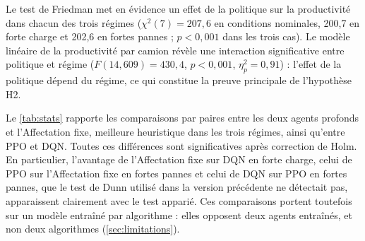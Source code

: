 \documentclass[11pt,a4paper]{article}
\newif\ifrevmarks
\newcommand{\revtag}[1]{\ifrevmarks\textsuperscript{\textcolor{red!70!black}{\scriptsize[#1]}}\fi}
\newenvironment{revbloc}[1]{\par\ifrevmarks\color{revcolor}\noindent\revtag{#1}\ \fi}{\par}
\begin{document}
\begin{revbloc}{M3, M4, M5, M6}
Le test de Friedman met en évidence un effet de la politique sur la productivité dans chacun des trois régimes ($\chi^2(7) = 207{,}6$ en conditions nominales, 200,7 en forte charge et 202,6 en fortes pannes ; $p<0{,}001$ dans les trois cas). Le modèle linéaire de la productivité par camion révèle une interaction significative entre politique et régime ($F(14, 609) = 430{,}4$, $p<0{,}001$, $\eta^2_p = 0{,}91$) : l'effet de la politique dépend du régime, ce qui constitue la preuve principale de l'hypothèse H2.

Le \cref{tab:stats} rapporte les comparaisons par paires entre les deux agents profonds et l'Affectation fixe, meilleure heuristique dans les trois régimes, ainsi qu'entre PPO et DQN. Toutes ces différences sont significatives après correction de Holm. En particulier, l'avantage de l'Affectation fixe sur DQN en forte charge, celui de PPO sur l'Affectation fixe en fortes pannes et celui de DQN sur PPO en fortes pannes, que le test de Dunn utilisé dans la version précédente ne détectait pas, apparaissent clairement avec le test apparié. Ces comparaisons portent toutefois sur un modèle entraîné par algorithme : elles opposent deux agents entraînés, et non deux algorithmes (\cref{sec:limitations}).
\end{revbloc}
\end{document}

